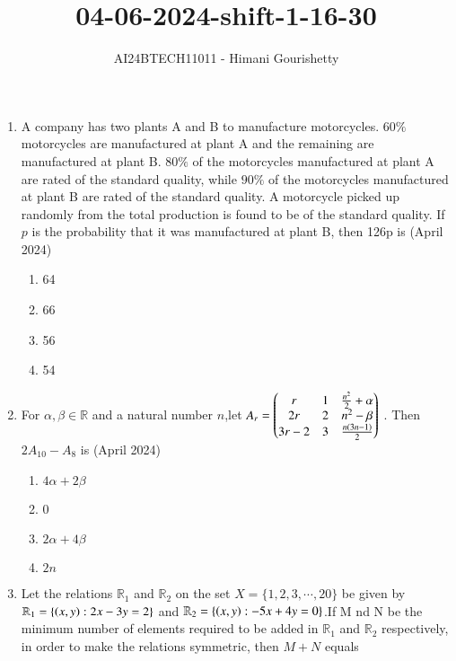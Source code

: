 \documentclass[journal,12pt,onecolumn]{IEEEtran}
\theoremstyle{remark}
\begin{document}

\vspace{3cm}

\title{04-06-2024-shift-1-16-30}
\author{AI24BTECH11011 - Himani Gourishetty}
\maketitle
\bigskip

\renewcommand{\thefigure}{\theenumi}
\renewcommand{\thetable}{\theenumi}
\begin{enumerate}
    \item A company has two plants A and B to manufacture motorcycles. $60\%$ motorcycles are manufactured at plant A and the remaining are manufactured at plant B. $80\%$ of the motorcycles manufactured at plant A are rated of the standard quality, while $90\%$ of the motorcycles manufactured at plant B are rated of the standard quality. A motorcycle picked up randomly from the total production is found to be of the standard quality. If $p$ is the probability that it was manufactured at plant B, then 126p is
  \hfill{(April 2024)}
\begin{enumerate}
        \item 64
        \item 66
        \item 56
        \item 54
    \end{enumerate}
    \item For $\alpha,\beta \in \mathbb{R}$ and a natural number $n$,let $A_r=\begin{pmatrix}r & 1 & \frac{n^2}{2}+\alpha \\ 2r & 2 & n^2-\beta \\ 3r-2 & 3 &\frac{n\left(3n-1\right)}{2}\end{pmatrix}$ . Then $2A_{10}-A_8$ is
\hfill{(April 2024)} 
\begin{enumerate}
        \item $4\alpha+2\beta$
        \item 0
        \item $2\alpha+4\beta$
        \item $2n$
    \end{enumerate}
    \item Let the relations $\mathbb{R}_1$ and $\mathbb{R}_2$ on the set $X=\{1,2,3,\cdots,20\}$ be given by $\mathbb{R}_1=\left\{\left(x,y\right):2x-3y=2\right\}$ and $\mathbb{R}_2=\left\{\left(x,y\right):-5x+4y=0\right\}$.If M nd N be the minimum number of elements required to be added in $\mathbb{R}_1$ and $\mathbb{R}_2$ respectively, in order to make the relations symmetric, then $M+N$ equals

\end{enumerate}
\end{document}
